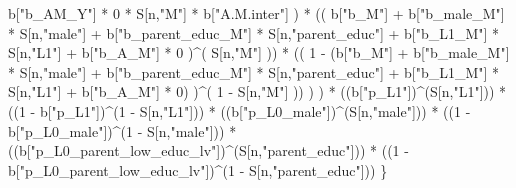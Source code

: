 \documentclass[
]{book}
\newenvironment{Shaded}{\begin{snugshade}}{\end{snugshade}}
\newcommand{\DecValTok}[1]{\textcolor[rgb]{0.00,0.00,0.81}{#1}}
\newcommand{\NormalTok}[1]{#1}
\newcommand{\SpecialCharTok}[1]{\textcolor[rgb]{0.00,0.00,0.00}{#1}}
\newcommand{\StringTok}[1]{\textcolor[rgb]{0.31,0.60,0.02}{#1}}
\begin{document}
\begin{Shaded}
\begin{Highlighting}[]
\NormalTok{                          b[}\StringTok{"b\_AM\_Y"}\NormalTok{] }\SpecialCharTok{*} \DecValTok{0} \SpecialCharTok{*}\NormalTok{ S[n,}\StringTok{"M"}\NormalTok{] }\SpecialCharTok{*}\NormalTok{ b[}\StringTok{"A.M.inter"}\NormalTok{] ) }\SpecialCharTok{*}
\NormalTok{                        (( b[}\StringTok{"b\_M"}\NormalTok{] }\SpecialCharTok{+} 
\NormalTok{                             b[}\StringTok{"b\_male\_M"}\NormalTok{] }\SpecialCharTok{*}\NormalTok{ S[n,}\StringTok{"male"}\NormalTok{] }\SpecialCharTok{+} 
\NormalTok{                             b[}\StringTok{"b\_parent\_educ\_M"}\NormalTok{] }\SpecialCharTok{*}\NormalTok{ S[n,}\StringTok{"parent\_educ"}\NormalTok{] }\SpecialCharTok{+} 
\NormalTok{                             b[}\StringTok{"b\_L1\_M"}\NormalTok{] }\SpecialCharTok{*}\NormalTok{ S[n,}\StringTok{"L1"}\NormalTok{] }\SpecialCharTok{+}
\NormalTok{                             b[}\StringTok{"b\_A\_M"}\NormalTok{] }\SpecialCharTok{*} \DecValTok{0}\NormalTok{ )}\SpecialCharTok{\^{}}\NormalTok{( S[n,}\StringTok{"M"}\NormalTok{] )) }\SpecialCharTok{*}
\NormalTok{                        (( }\DecValTok{1} \SpecialCharTok{{-}}\NormalTok{ (b[}\StringTok{"b\_M"}\NormalTok{] }\SpecialCharTok{+} 
\NormalTok{                                  b[}\StringTok{"b\_male\_M"}\NormalTok{] }\SpecialCharTok{*}\NormalTok{ S[n,}\StringTok{"male"}\NormalTok{] }\SpecialCharTok{+} 
\NormalTok{                                  b[}\StringTok{"b\_parent\_educ\_M"}\NormalTok{] }\SpecialCharTok{*}\NormalTok{ S[n,}\StringTok{"parent\_educ"}\NormalTok{] }\SpecialCharTok{+} 
\NormalTok{                                  b[}\StringTok{"b\_L1\_M"}\NormalTok{] }\SpecialCharTok{*}\NormalTok{ S[n,}\StringTok{"L1"}\NormalTok{] }\SpecialCharTok{+}
\NormalTok{                                  b[}\StringTok{"b\_A\_M"}\NormalTok{] }\SpecialCharTok{*} \DecValTok{0}\NormalTok{) )}\SpecialCharTok{\^{}}\NormalTok{( }\DecValTok{1} \SpecialCharTok{{-}}\NormalTok{ S[n,}\StringTok{"M"}\NormalTok{] )) ) ) }\SpecialCharTok{*}
\NormalTok{    ((b[}\StringTok{"p\_L1"}\NormalTok{])}\SpecialCharTok{\^{}}\NormalTok{(S[n,}\StringTok{"L1"}\NormalTok{])) }\SpecialCharTok{*}
\NormalTok{    ((}\DecValTok{1} \SpecialCharTok{{-}}\NormalTok{ b[}\StringTok{"p\_L1"}\NormalTok{])}\SpecialCharTok{\^{}}\NormalTok{(}\DecValTok{1} \SpecialCharTok{{-}}\NormalTok{ S[n,}\StringTok{"L1"}\NormalTok{])) }\SpecialCharTok{*}
\NormalTok{    ((b[}\StringTok{"p\_L0\_male"}\NormalTok{])}\SpecialCharTok{\^{}}\NormalTok{(S[n,}\StringTok{"male"}\NormalTok{])) }\SpecialCharTok{*} 
\NormalTok{    ((}\DecValTok{1} \SpecialCharTok{{-}}\NormalTok{ b[}\StringTok{"p\_L0\_male"}\NormalTok{])}\SpecialCharTok{\^{}}\NormalTok{(}\DecValTok{1} \SpecialCharTok{{-}}\NormalTok{ S[n,}\StringTok{"male"}\NormalTok{])) }\SpecialCharTok{*} 
\NormalTok{    ((b[}\StringTok{"p\_L0\_parent\_low\_educ\_lv"}\NormalTok{])}\SpecialCharTok{\^{}}\NormalTok{(S[n,}\StringTok{"parent\_educ"}\NormalTok{])) }\SpecialCharTok{*}
\NormalTok{    ((}\DecValTok{1} \SpecialCharTok{{-}}\NormalTok{ b[}\StringTok{"p\_L0\_parent\_low\_educ\_lv"}\NormalTok{])}\SpecialCharTok{\^{}}\NormalTok{(}\DecValTok{1} \SpecialCharTok{{-}}\NormalTok{ S[n,}\StringTok{"parent\_educ"}\NormalTok{])) }
\NormalTok{\}}


\end{Highlighting}
\end{Shaded}
\end{document}

